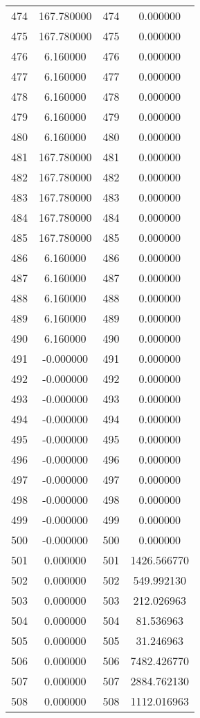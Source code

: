 \documentclass[12pt]{article}
\begin{document}
\begin{longtable}{@{}cccc@{}}
474 & 167.780000 & 474 & 0.000000 \\
475 & 167.780000 & 475 & 0.000000 \\
476 & 6.160000 & 476 & 0.000000 \\
477 & 6.160000 & 477 & 0.000000 \\
478 & 6.160000 & 478 & 0.000000 \\
479 & 6.160000 & 479 & 0.000000 \\
480 & 6.160000 & 480 & 0.000000 \\
481 & 167.780000 & 481 & 0.000000 \\
482 & 167.780000 & 482 & 0.000000 \\
483 & 167.780000 & 483 & 0.000000 \\
484 & 167.780000 & 484 & 0.000000 \\
485 & 167.780000 & 485 & 0.000000 \\
486 & 6.160000 & 486 & 0.000000 \\
487 & 6.160000 & 487 & 0.000000 \\
488 & 6.160000 & 488 & 0.000000 \\
489 & 6.160000 & 489 & 0.000000 \\
490 & 6.160000 & 490 & 0.000000 \\
491 & -0.000000 & 491 & 0.000000 \\
492 & -0.000000 & 492 & 0.000000 \\
493 & -0.000000 & 493 & 0.000000 \\
494 & -0.000000 & 494 & 0.000000 \\
495 & -0.000000 & 495 & 0.000000 \\
496 & -0.000000 & 496 & 0.000000 \\
497 & -0.000000 & 497 & 0.000000 \\
498 & -0.000000 & 498 & 0.000000 \\
499 & -0.000000 & 499 & 0.000000 \\
500 & -0.000000 & 500 & 0.000000 \\
501 & 0.000000 & 501 & 1426.566770 \\
502 & 0.000000 & 502 & 549.992130 \\
503 & 0.000000 & 503 & 212.026963 \\
504 & 0.000000 & 504 & 81.536963 \\
505 & 0.000000 & 505 & 31.246963 \\
506 & 0.000000 & 506 & 7482.426770 \\
507 & 0.000000 & 507 & 2884.762130 \\
508 & 0.000000 & 508 & 1112.016963 \\

\end{longtable}
\end{document}
